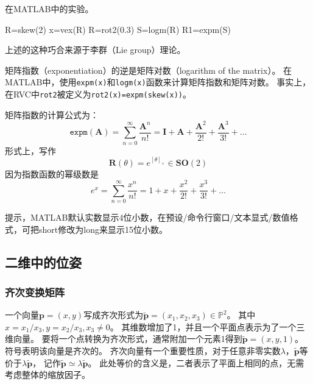 \documentclass[UTF8,a4paper,10pt]{ctexart}
\begin{document}
在MATLAB中的实验。
\begin{matlab}
  R=skew(2)
  x=vex(R)
  R=rot2(0.3)
  S=logm(R)    %
  R1=expm(S)   %
\end{matlab}
上述的这种巧合来源于李群（Lie group）理论。

矩阵指数（exponentiation）的逆是矩阵对数（logarithm of the matrix）。
在MATLAB中，使用\verb|expm(x)|和\verb|logm(x)|函数来计算矩阵指数和矩阵对数。
事实上，在RVC中\verb|rot2|被定义为\verb|rot2(x)=expm(skew(x))|。

矩阵指数的计算公式为：
$$
\mathtt{expm}(\mathbf{A})
=\sum_{n=0}^{\infty}\frac{\mathbf{A}^n}{n!}
=\mathbf{I}+\mathbf{A}+\frac{\mathbf{A}^2}{2!}+\frac{\mathbf{A}^3}{3!}+\ldots
$$
形式上，写作
$$
\mathbf{R}(\theta)=e^{[\theta]_{\times}}\in\mathbf{SO}(2)
$$
因为指数函数的幂级数是
$$
e^{x}=\sum_{n=0}^{\infty}\frac{x^n}{n!}=1+x+\frac{x^2}{2!}+\frac{x^3}{3!}+\ldots
$$

提示，MATLAB默认实数显示4位小数，在预设/命令行窗口/文本显式/数值格式，可把short修改为long来显示15位小数。

\subsection{二维中的位姿}

\subsubsection{齐次变换矩阵}

一个向量$\mathbf{p}=(x,y)$写成齐次形式为$\tilde{\mathbf{p}}=(x_1,x_2,x_3)\in\mathbb{P}^2$。
其中$x=x_1/x_3, y=x_2/x_3, x_3\neq0$。
其维数增加了1，并且一个平面点表示为了一个三维向量。
要将一个点转换为齐次形式，通常附加一个元素1得到$\tilde{\mathbf{p}}=(x,y,1)$。符号$\tilde{}$表明该向量是齐次的。
齐次向量有一个重要性质，对于任意非零实数$\lambda$，$\tilde{\mathbf{p}}$等价于$\lambda\tilde{\mathbf{p}}$，
记作$\tilde{\mathbf{p}}\simeq\lambda\tilde{\mathbf{p}}$。
此处等价的含义是，二者表示了平面上相同的点，无需考虑整体的缩放因子。
\end{document}
